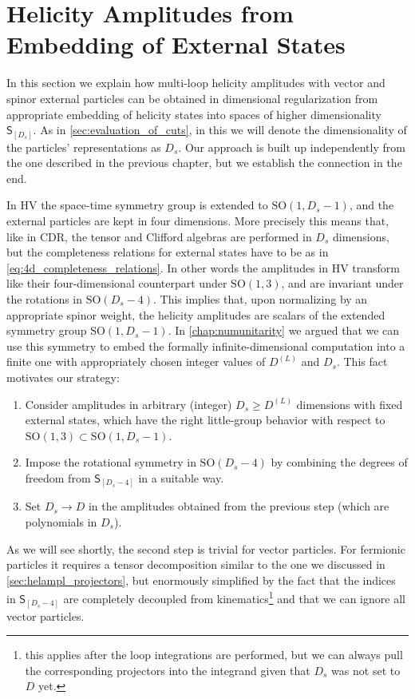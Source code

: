 \section{Helicity Amplitudes from Embedding of External States}
\label{sec:helampl_embeding}

In this section we explain how multi-loop helicity amplitudes
with vector and spinor external particles can be obtained in dimensional regularization
from appropriate embedding of helicity states into spaces of higher dimensionality $\mathsf{S}_{[D_s]}$.
As in \cref{sec:evaluation_of_cuts}, in this  we will denote the dimensionality of the particles'
representations as $D_s$.
Our approach is built up independently from the one described in the previous chapter, but we establish
the connection in the end.

In HV the space-time symmetry group is extended to $\mathrm{SO}(1,D_s-1)$, and the external particles are kept in four dimensions. 
More precisely this means that, like in CDR, the tensor and Clifford algebras are performed in $D_s$ dimensions,
but the completeness relations for external states have to be as in \cref{eq:4d_completeness_relations}. 
In other words the amplitudes in HV transform like their four-dimensional counterpart under $\mathrm{SO}(1,3)$, 
and are invariant under the rotations in $\mathrm{SO}(D_s-4)$. 
This implies that, upon normalizing by an appropriate spinor weight, the helicity amplitudes are scalars of the extended symmetry group $\mathrm{SO}(1,D_s-1)$.
In \cref{chap:numunitarity} we argued that we can use this symmetry to embed the formally infinite-dimensional computation
into a finite one with appropriately chosen integer values of $D^{(L)}$ and $D_s$.
This fact motivates our strategy:
\begin{enumerate}
  \item Consider amplitudes in arbitrary (integer) $D_s \geq  D^{(L)}$ dimensions with fixed external states,
    which have the right little-group behavior with respect to $\mathrm{SO}(1,3) \subset \mathrm{SO}(1,D_s-1)$.
  \item Impose the rotational symmetry in $\mathrm{SO}(D_s-4)$ by combining the degrees of freedom from $\mathsf{S}_{[D_s-4]}$ in
    a suitable way.
  \item Set $D_s\to D$ in the amplitudes obtained from the previous step (which are polynomials in $D_s$).
\end{enumerate}
As we will see shortly, the second step is trivial for vector particles. For fermionic
particles it requires a tensor decomposition similar to the one we discussed in \cref{sec:helampl_projectors},
but enormously simplified by the fact that the indices in  $\mathsf{S}_{[D_s-4]}$ are completely decoupled from kinematics\footnote{
  this applies after the loop integrations are performed, 
  but we can always pull the corresponding projectors into the integrand given that $D_s$ was not set to $D$ yet.
}
and that we can ignore all vector particles.



